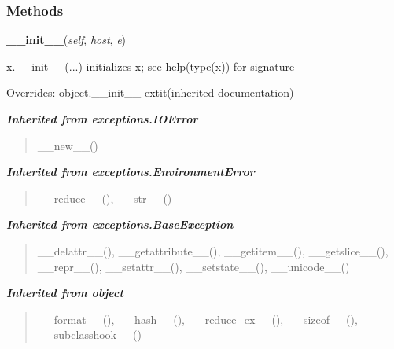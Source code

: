 
  \subsubsection{Methods}

    \vspace{0.5ex}

\hspace{.8\funcindent}\begin{boxedminipage}{\funcwidth}

    \raggedright \textbf{\_\_init\_\_}(\textit{self}, \textit{host}, \textit{e})

\setlength{\parskip}{2ex}
    x.\_\_init\_\_(...) initializes x; see help(type(x)) for signature

\setlength{\parskip}{1ex}
      Overrides: object.\_\_init\_\_ 	extit{(inherited documentation)}

    \end{boxedminipage}


\large{\textbf{\textit{Inherited from exceptions.IOError}}}

\begin{quote}
\_\_new\_\_()
\end{quote}

\large{\textbf{\textit{Inherited from exceptions.EnvironmentError}}}

\begin{quote}
\_\_reduce\_\_(), \_\_str\_\_()
\end{quote}

\large{\textbf{\textit{Inherited from exceptions.BaseException}}}

\begin{quote}
\_\_delattr\_\_(), \_\_getattribute\_\_(), \_\_getitem\_\_(), \_\_getslice\_\_(), \_\_repr\_\_(), \_\_setattr\_\_(), \_\_setstate\_\_(), \_\_unicode\_\_()
\end{quote}

\large{\textbf{\textit{Inherited from object}}}

\begin{quote}
\_\_format\_\_(), \_\_hash\_\_(), \_\_reduce\_ex\_\_(), \_\_sizeof\_\_(), \_\_subclasshook\_\_()
\end{quote}


